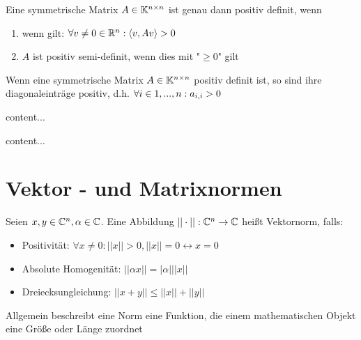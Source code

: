 \begin{satz}
	Eine symmetrische Matrix $A \in \mathbb{K}^{n \times n}$ ist genau dann positiv definit, wenn
	\begin{enumerate}[noitemsep]
		\item wenn gilt: $\forall v \neq 0 \in \mathbb{R}^n : \langle v, Av \rangle > 0$
		\item $A$ ist positiv semi-definit, wenn dies mit "$\geq 0$" gilt
	\end{enumerate}
\end{satz}

\begin{satz}
	Wenn eine symmetrische Matrix $A \in \mathbb{K}^{n \times n}$  positiv definit ist, so sind ihre diagonaleinträge positiv, d.h. $\forall i \in 1,...,n : a_{i,i} > 0$	
\end{satz}

\begin{definition}[Minor]
	content...
\end{definition}

\begin{satz}
	content...
\end{satz}

\pagebreak

\section{Vektor - und Matrixnormen}

\begin{definition}[Vektornorm]
	Seien $x, y \in \mathbb{C}^n, \alpha \in \mathbb{C}$. Eine Abbildung $||\cdot|| : \mathbb{C}^n \rightarrow \mathbb{C}$ heißt Vektornorm, falls:
	
	\begin{itemize}[noitemsep]
		\item Positivität: $\forall x \neq 0 : ||x|| > 0, ||x|| = 0 \leftrightarrow x = 0 $
		\item Absolute Homogenität: $||\alpha x|| = |\alpha| ||x||$
		\item Dreiecksungleichung: $||x + y|| \leq ||x|| + ||y||$
	\end{itemize}

	Allgemein beschreibt eine Norm eine Funktion, die einem mathematischen Objekt eine Größe oder Länge zuordnet
\end{definition}

